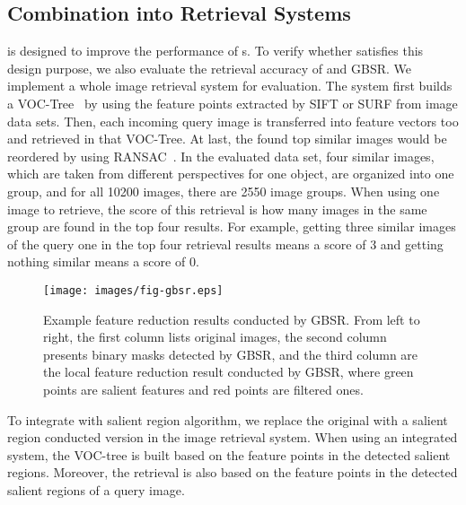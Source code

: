 \subsection{Combination into Retrieval Systems}
\label{sec:evaluation_integration}



{\sys} is designed to improve the performance of {\lfea}s. To verify whether {\sys} satisfies this design purpose, we also evaluate the retrieval accuracy of {\sys} and GBSR. We implement a whole image retrieval system for evaluation. The system first builds a VOC-Tree~\cite{nister2006scalable} by using the feature points extracted by SIFT or SURF from image data sets. Then, each incoming query image is transferred into feature vectors too and retrieved in that VOC-Tree. At last, the found top similar images would be reordered by using RANSAC~\cite{fischler1981random}. In the evaluated data set, four similar images, which are taken from different perspectives for one object, are organized into one group, and for all 10200 images, there are 2550 image groups. When using one image to retrieve, the score of this retrieval is how many images in the same group are found in the top four results. For example, getting three similar images of the query one in the top four retrieval results means a score of 3 and getting nothing similar means a score of 0.

\begin{figure*}[!ht]
\centering
\texttt{[image: images/fig-gbsr.eps]}
\caption{Example feature reduction results conducted by GBSR. From left to right, the first column lists original images, the second column presents binary masks detected by GBSR, and the third column are the local feature reduction result conducted by GBSR, where green points are salient features and red points are filtered ones.}
\label{fig:gbsr}
\end{figure*}

To integrate with salient region algorithm, we replace the original {\lfea} with a salient region conducted version in the image retrieval system. When using an integrated system, the VOC-tree is built based on the feature points in the detected salient regions. Moreover, the retrieval is also based on the feature points in the detected salient regions of a query image.

